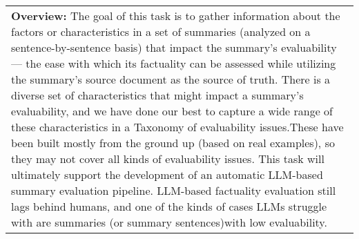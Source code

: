 \begin{table*}
\centering
\small
\begin{tabular}{@{}p{14cm}@{}}
\toprule
\textbf{Overview:}
\newline
The goal of this task is to gather information about the factors or characteristics in a set of summaries (analyzed on a sentence-by-sentence basis) that impact the summary’s evaluability — the ease with which its factuality can be assessed while utilizing the summary’s source document as the source of truth. There is a diverse set of characteristics that might impact a summary’s evaluability, and we have done our best to capture a wide range of these characteristics in a Taxonomy of evaluability issues.These have been built mostly from the ground up (based on real examples), so they may not cover all kinds of evaluability issues.
\newline
\newline
This task will ultimately support the development of an automatic LLM-based summary evaluation pipeline. LLM-based factuality evaluation still lags behind humans, and one of the kinds of cases LLMs struggle with are summaries (or summary sentences)with low evaluability.
\newline
\newline


\end{tabular}
\end{table*}
